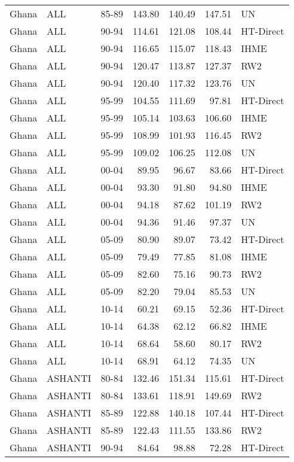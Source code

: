 \begin{longtable}{lllrrrl}
  Ghana & ALL & 85-89 & 143.80 & 140.49 & 147.51 & UN \\ 
  Ghana & ALL & 90-94 & 114.61 & 121.08 & 108.44 & HT-Direct \\ 
  Ghana & ALL & 90-94 & 116.65 & 115.07 & 118.43 & IHME \\ 
  Ghana & ALL & 90-94 & 120.47 & 113.87 & 127.37 & RW2 \\ 
  Ghana & ALL & 90-94 & 120.40 & 117.32 & 123.76 & UN \\ 
  Ghana & ALL & 95-99 & 104.55 & 111.69 & 97.81 & HT-Direct \\ 
  Ghana & ALL & 95-99 & 105.14 & 103.63 & 106.60 & IHME \\ 
  Ghana & ALL & 95-99 & 108.99 & 101.93 & 116.45 & RW2 \\ 
  Ghana & ALL & 95-99 & 109.02 & 106.25 & 112.08 & UN \\ 
  Ghana & ALL & 00-04 & 89.95 & 96.67 & 83.66 & HT-Direct \\ 
  Ghana & ALL & 00-04 & 93.30 & 91.80 & 94.80 & IHME \\ 
  Ghana & ALL & 00-04 & 94.18 & 87.62 & 101.19 & RW2 \\ 
  Ghana & ALL & 00-04 & 94.36 & 91.46 & 97.37 & UN \\ 
  Ghana & ALL & 05-09 & 80.90 & 89.07 & 73.42 & HT-Direct \\ 
  Ghana & ALL & 05-09 & 79.49 & 77.85 & 81.08 & IHME \\ 
  Ghana & ALL & 05-09 & 82.60 & 75.16 & 90.73 & RW2 \\ 
  Ghana & ALL & 05-09 & 82.20 & 79.04 & 85.53 & UN \\ 
  Ghana & ALL & 10-14 & 60.21 & 69.15 & 52.36 & HT-Direct \\ 
  Ghana & ALL & 10-14 & 64.38 & 62.12 & 66.82 & IHME \\ 
  Ghana & ALL & 10-14 & 68.64 & 58.60 & 80.17 & RW2 \\ 
  Ghana & ALL & 10-14 & 68.91 & 64.12 & 74.35 & UN \\ 
  Ghana & ASHANTI & 80-84 & 132.46 & 151.34 & 115.61 & HT-Direct \\ 
  Ghana & ASHANTI & 80-84 & 133.61 & 118.91 & 149.69 & RW2 \\ 
  Ghana & ASHANTI & 85-89 & 122.88 & 140.18 & 107.44 & HT-Direct \\ 
  Ghana & ASHANTI & 85-89 & 122.43 & 111.55 & 133.86 & RW2 \\ 
  Ghana & ASHANTI & 90-94 & 84.64 & 98.88 & 72.28 & HT-Direct \\ 

\end{longtable}
